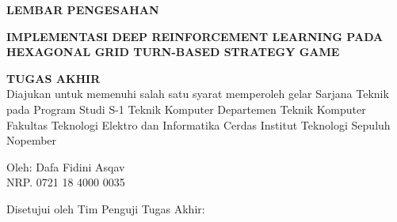 \begin{center}
	\large
  \textbf{LEMBAR PENGESAHAN}
\end{center}

\thispagestyle{empty}

\begin{center}
  \textbf{IMPLEMENTASI DEEP REINFORCEMENT LEARNING PADA HEXAGONAL GRID TURN-BASED STRATEGY GAME}
\end{center}

\begingroup
  \small
  

  \begin{center}
    \textbf{TUGAS AKHIR}
    \\Diajukan untuk memenuhi salah satu syarat memperoleh gelar Sarjana Teknik pada Program Studi S-1 Teknik Komputer Departemen Teknik Komputer Fakultas Teknologi Elektro dan Informatika Cerdas Institut Teknologi Sepuluh Nopember
  \end{center}


  \begin{center}
    Oleh: Dafa Fidini Asqav 
    \\NRP. 0721 18 4000 0035
  \end{center}



  \begin{center}
    Disetujui oleh Tim Penguji Tugas Akhir:
  \end{center}


  \begingroup
    \setlength{\tabcolsep}{0pt}

